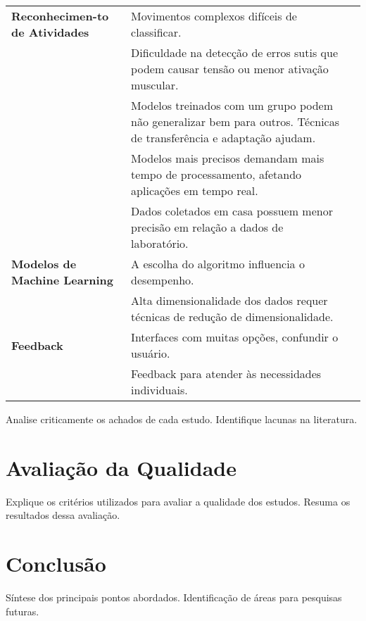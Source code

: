 \documentclass[a4paper,12pt]{article}
\begin{document}
\begin{longtable}{|p{3cm}|p{6cm}|p{3.4cm}|}
\textbf{Reconhecimen-to de Atividades} & Movimentos complexos difíceis de classificar. & \cite{Johnson2021, Tian2021, Simon2023, MallolRagolta2021, Akpa2018, Zou2020, Kwon2021} \\ \cline{2-3}
& Dificuldade na detecção de erros sutis que podem causar tensão ou menor ativação muscular. & \cite{Johnson2021, papadopoulou2023towards, Hussain2024, Zou2020, Zhang2018, Koskimaki2014, Michaud2021, } \\ \cline{2-3}
& Modelos treinados com um grupo podem não generalizar bem para outros. Técnicas de transferência e adaptação ajudam. & \\ \cline{2-3}
& Modelos mais precisos demandam mais tempo de processamento, afetando aplicações em tempo real. & \\ \cline{2-3}
& Dados coletados em casa possuem menor precisão em relação a dados de laboratório. & \\ \hline

\textbf{Modelos de Machine Learning} & A escolha do algoritmo influencia o desempenho. & \\ \cline{2-3}
& Alta dimensionalidade dos dados requer técnicas de redução de dimensionalidade. & \\ \hline

\textbf{Feedback} & Interfaces com muitas opções, confundir o usuário. & \\ \cline{2-3}
& Feedback para atender às necessidades individuais. & \\ \hline

\end{longtable}

Analise criticamente os achados de cada estudo. Identifique lacunas na literatura.

\section*{Avaliação da Qualidade}
Explique os critérios utilizados para avaliar a qualidade dos estudos. Resuma os resultados dessa avaliação.

\section{Conclusão}
Síntese dos principais pontos abordados. Identificação de áreas para pesquisas futuras.

\printbibliography
\end{document}
